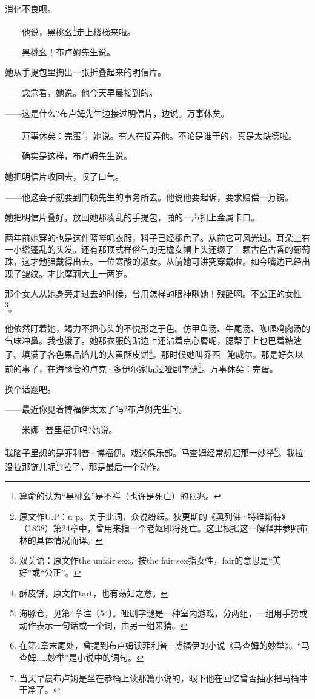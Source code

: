 \par 消化不良呗。
\par ——他说，黑桃幺\footnote{算命的认为“黑桃幺”是不祥（也许是死亡）的预兆。}走上楼梯来啦。
\par ——黑桃幺！布卢姆先生说。
\par 她从手提包里掏出一张折叠起来的明信片。
\par ——念念看，她说。他今天早晨接到的。
\par ——这是什么?布卢姆先生边接过明信片，边说。万事休矣。
\par ——万事休矣：完蛋\footnote{原文作U.P：u p。关于此词，众说纷纭。狄更斯的《奥列佛·特维斯特》（1838）第24章中，曾用来指一个老妪即将死亡。这里根据这一解释并参照布林的具体情况而译。}，她说。有人在捉弄他。不论是谁干的，真是太缺德啦。
\par ——确实是这样，布卢姆先生说。
\par 她把明信片收回去，叹了口气。
\par ——他这会子就要到门顿先生的事务所去。他说他要起诉，要求赔偿一万镑。
\par 她把明信片叠好，放回她那凌乱的手提包，啪的一声扣上金属卡口。
\par 两年前她穿的也是这件蓝哔叽衣服，料子已经褪色了。从前它可风光过。耳朵上有一小绺蓬乱的头发。还有那顶式样俗气的无檐女帽上头还缀了三颗古色古香的葡萄珠，这才勉强戴得出去。一位寒酸的淑女。从前她可讲究穿戴啦。如今嘴边已经出现了皱纹。才比摩莉大上一两岁。
\par 那个女人从她身旁走过去的时候，曾用怎样的眼神瞅她！残酷啊。不公正的女性\footnote{双关语：原文作the unfair sex。按the fair sex指女性，fair的意思是“美好”或“公正”。}。
\par 他依然盯着她，竭力不把心头的不悦形之于色。仿甲鱼汤、牛尾汤、咖喱鸡肉汤的气味冲鼻。我也饿了。她那衣服的贴边上还沾着点心屑呢，腮帮子上也巴着糖渣子。填满了各色果品馅儿的大黄酥皮饼\footnote{酥皮饼，原文作tart，也有荡妇之意。}。那时候她叫乔西·鲍威尔。那是好久以前的事了，在海豚仓的卢克·多伊尔家玩过哑剧字谜\footnote{海豚仓，见第4章注〔54〕。哑剧字谜是一种室内游戏，分两组，一组用手势或动作表示一句话或一个词，由另一组来猜。}。万事休矣：完蛋。
\par 换个话题吧。
\par ——最近你见着博福伊太太了吗?布卢姆先生问。
\par ——米娜·普里福伊吗?她说。
\par 我脑子里想的是菲利普·博福伊。戏迷俱乐部。马查姆经常想起那一妙举\footnote{在第4章末尾处，曾提到布卢姆读菲利普·博福伊的小说《马查姆的妙举》。“马查姆……妙举”是小说中的词句。}。我拉没拉那链儿呢\footnote{当天早晨布卢姆是坐在恭桶上读那篇小说的，眼下他在回忆曾否抽水把马桶冲干净了。}?拉了，那是最后一个动作。
